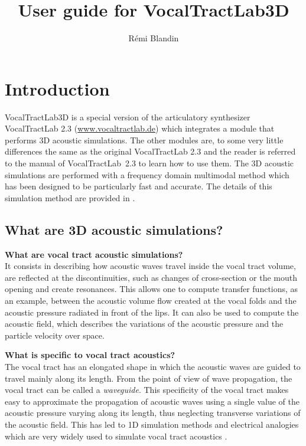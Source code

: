 \documentclass[]{article}
\title{User guide for VocalTractLab3D}
\author{R{\'e}mi Blandin}
\begin{document}
	
	\lstset{ 
		language=Matlab, 
		tabsize=2, 
		showspaces=false, 
		showstringspaces=false, 
		float=[htb], 
		captionpos=b, 
		basicstyle=\footnotesize, 
		frame=tbrl, %
		frameround=tttt, 
		numbers=left, 
		numberstyle=\tiny, 
		numberblanklines=false, 
	} 
	
	
	\maketitle
	
	\tableofcontents
	
	\section{Introduction}
	
	VocalTractLab3D is a special version of the articulatory synthesizer
	VocalTractLab 2.3 \cite{birkholz2013modeling} (\url{www.vocaltractlab.de})
	which integrates a module that performs 3D acoustic simulations. The other modules are, to some very little differences the same as the original VocalTractLab 2.3 
	and the reader is referred to the manual of VocalTractLab~2.3 to learn
	how to use them.
	The 3D acoustic simulations are performed with a frequency domain
	multimodal method which has been designed to be particularly 
	fast and accurate. The details of this simulation method are 
	provided in \textcite{blandin2022efficient}.
	
	\subsection{What are 3D acoustic simulations?}
	
	\textbf{What are vocal tract acoustic simulations?}\\ 
	It consists in describing how acoustic waves travel
	inside the vocal tract volume, are reflected at the discontinuities, such as 
	changes of cross-section or the mouth opening and create resonances. 
	This allows one to compute transfer functions, as an example, between the acoustic volume flow created at the vocal folds and the acoustic pressure radiated in front of the lips. It can also be used to 
	compute the acoustic field, which describes the variations of the  
	acoustic pressure and the particle velocity over space.
	
	\textbf{What is specific to vocal tract acoustics?}\\
	The vocal tract has an elongated shape in which the acoustic waves 
	are guided to travel mainly along its length. From the point
	of view of wave propagation, the vocal tract can be called a 
	\emph{waveguide}.
	This specificity of the vocal tract makes easy to approximate the 
	propagation of acoustic waves using a single value of the acoustic 
	pressure varying along its length, thus neglecting transverse 
	variations of the acoustic field. This has led to 1D simulation 
	methods and electrical analogies which are very widely used to 
	simulate vocal tract acoustics \cite{sondhi1987hybrid}.
	
\end{document}
